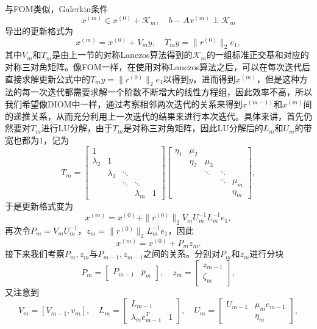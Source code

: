 \documentclass[a4paper,10pt]{ctexart}
\begin{document}
与FOM类似，Galerkin条件
\[
    x^{(m)}\in x^{(0)}+\mathcal{K}_m,\quad b - Ax^{(m)}\perp \mathcal{K}_m
\]
导出的更新格式为
\begin{equation}
    x^{(m)} = x^{(0)} + V_m y,\quad T_my = \| r^{(0)} \|_2 e_1,
\end{equation}
其中$ V_m $和$ T_m $是由上一节的对称Lanczos算法得到的$ \mathcal{K}_m $的一组标准正交基和对应的对称三对角矩阵。像FOM一样，在使用对称Lanczos算法之后，可以在每次迭代后直接求解更新公式中的$ T_my = \| r^{(0)} \|_2 e_1 $以得到$ y $，进而得到$ x^{(m)} $，但是这种方法的每一次迭代都需要求解一个阶数不断增大的线性方程组，因此效率不高，所以我们希望像DIOM中一样，通过考察相邻两次迭代的关系来得到$ x^{(m-1)} $和$ x^{(m)} $间的递推关系，从而充分利用上一次迭代的结果来进行本次迭代。具体来讲，首先仍然要对$ T_m $进行LU分解，由于$ T_m $是对称三对角矩阵，因此LU分解后的$ L_m $和$ U_m $的带宽也都为$ 1 $，记为
\[
    T_m = 
    \begin{bmatrix} 
        1 &  & & &\\
        \lambda_2 & 1 &  & &\\
        & \lambda_3 & \ddots & &\\
        & & \ddots & \ddots & \\
        & & & \lambda_m & 1
    \end{bmatrix}
    \begin{bmatrix} 
        \eta_1 & \mu_2 & & &\\
        & \eta_2 & \mu_3 & &\\
        & & \ddots & \ddots &\\
        & & & \ddots & \mu_m\\
        & & & & \eta_m
    \end{bmatrix},
\]
于是更新格式变为
\[
    x^{(m)} = x^{(0)} + \| r^{(0)} \|_2 V_m U_m^{-1}L^{-1}_m e_1,
\]
再次令$ P_m = V_m U_m^{-1} $，$ z_m = \| r^{(0)} \|_2 L_m^{-1}e_1 $，因此
\begin{equation}
    x^{(m)} = x^{(0)} + P_m z_m.
\end{equation}
接下来我们考察$ P_m,z_m $与$ P_{m-1},z_{m-1} $之间的关系。分别对$ P_m $和$ z_m $进行分块
\[
    P_m = 
    \begin{bmatrix} 
        P_{m-1} & p_m
    \end{bmatrix},\quad 
    z_m = 
    \begin{bmatrix} 
        z_{m-1} \\ \zeta_m
    \end{bmatrix},
\]
又注意到
\[
    V_m = [V_{m-1},v_m],\quad 
    L_m = 
    \begin{bmatrix} 
        L_{m-1} & \\
        \lambda_m e_{m-1}^T & 1
    \end{bmatrix},\quad 
    U_m =
    \begin{bmatrix} 
        U_{m-1} & \mu_m e_{m-1} \\
        & \eta_m
    \end{bmatrix},
\]
\end{document}
